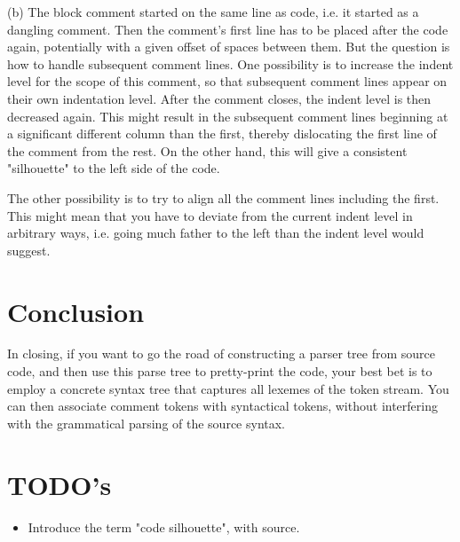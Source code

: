 \documentclass[11pt,a4paper]{article}
\begin{document}
(b) The block comment started on the same line as code, i.e. it started as a
dangling comment. Then the comment's first line has to be placed after the code
again, potentially with a given offset of spaces between them. But the question
is how to handle subsequent comment lines. One possibility is to increase the
indent level for the scope of this comment, so that subsequent comment lines
appear on their own indentation level. After the comment closes, the indent
level is then decreased again. This might result in the subsequent comment lines
beginning at a significant different column than the first, thereby dislocating
the first line of the comment from the rest. On the other hand, this will give a
consistent "silhouette" to the left side of the code.

The other possibility is to try to align all the comment lines including the
first. This might mean that you have to deviate from the current indent level in
arbitrary ways, i.e. going much father to the left than the indent level would
suggest.

\section{Conclusion}

In closing, if you want to go the road of constructing a parser tree from source
code, and then use this parse tree to pretty-print the code, your best bet is to
employ a concrete syntax tree that captures all lexemes of the token stream. You
can then associate comment tokens with syntactical tokens, without interfering
with the grammatical parsing of the source syntax. 

\section{TODO's}

\begin{itemize}
\item Introduce the term "code silhouette", with source.
\end{itemize}




\end{document}
